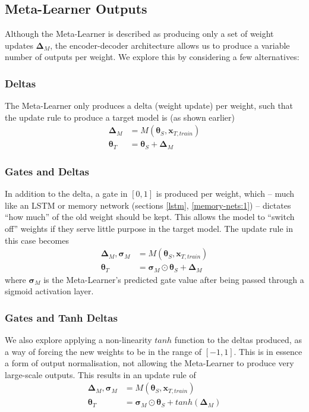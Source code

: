 \documentclass{report}
\begin{document}
\subsection{Meta-Learner Outputs}
Although the Meta-Learner is described as producing only a set of weight updates $\bm{\Delta}_M$, the encoder-decoder architecture allows us to produce a variable number of outputs per weight. We explore this by considering a few alternatives:

\subsubsection{Deltas}
The Meta-Learner only produces a delta (weight update) per weight, such that the update rule to produce a target model is (as shown earlier)
\begin{align}
\bm{\Delta}_M &= M(\bm{\theta}_S, \bm{x}_{T,train}) \\
\bm{\theta}_T &= \bm{\theta}_S + \bm{\Delta}_M \label{eqn-delta-updates}
\end{align}


\subsubsection{Gates and Deltas}
In addition to the delta, a gate in $[0, 1]$ is produced per weight, which -- much like an LSTM or memory network (sections \ref{lstm}, \ref{memory-nets:1}) -- dictates ``how much'' of the old weight should be kept. This allows the model to ``switch off'' weights if they serve little purpose in the target model. The update rule in this case becomes
\begin{align}
\bm{\Delta}_M, \bm{\sigma}_M &= M(\bm{\theta}_S, \bm{x}_{T,train}) \\
\bm{\theta}_T &= \bm{\sigma}_M \odot \bm{\theta}_S + \bm{\Delta}_M
\end{align}
where $\bm{\sigma}_M$ is the Meta-Learner's predicted gate value after being passed through a sigmoid activation layer.


\subsubsection{Gates and Tanh Deltas}
We also explore applying a non-linearity $tanh$ function to the deltas produced, as a way of forcing the new weights to be in the range of $[-1, 1]$. This is in essence a form of output normalisation, not allowing the Meta-Learner to produce very large-scale outputs. This results in an update rule of
\begin{align}
\bm{\Delta}_M, \bm{\sigma}_M &= M(\bm{\theta}_S, \bm{x}_{T,train}) \\
\bm{\theta}_T &= \bm{\sigma}_M \odot \bm{\theta}_S + tanh(\bm{\Delta}_M)
\end{align}
\end{document}
